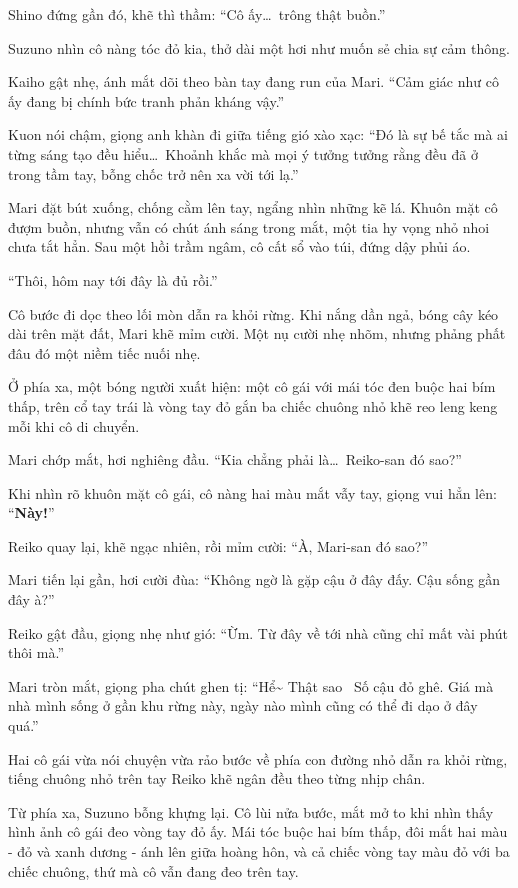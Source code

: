 \documentclass[../main.tex]{subfiles}
\begin{document}
Shino đứng gần đó, khẽ thì thầm: ``Cô ấy\dots\ trông thật buồn.''

Suzuno nhìn cô nàng tóc đỏ kia, thở dài một hơi như muốn sẻ chia sự cảm thông.

Kaiho gật nhẹ, ánh mắt dõi theo bàn tay đang run của Mari. ``Cảm giác như cô ấy đang bị chính bức tranh phản kháng vậy.''

Kuon nói chậm, giọng anh khàn đi giữa tiếng gió xào xạc: ``Đó là sự bế tắc mà ai từng sáng tạo đều hiểu\dots\ Khoảnh khắc mà mọi ý tưởng tưởng rằng đều đã ở trong tầm tay, bỗng chốc trở nên xa vời tới lạ.''

Mari đặt bút xuống, chống cằm lên tay, ngẩng nhìn những kẽ lá. Khuôn mặt cô đượm buồn, nhưng vẫn có chút ánh sáng trong mắt, một tia hy vọng nhỏ nhoi chưa tắt hẳn. Sau một hồi trầm ngâm, cô cất sổ vào túi, đứng dậy phủi áo.

``Thôi, hôm nay tới đây là đủ rồi.''

Cô bước đi dọc theo lối mòn dẫn ra khỏi rừng. Khi nắng dần ngả, bóng cây kéo dài trên mặt đất, Mari khẽ mỉm cười. Một nụ cười nhẹ nhõm, nhưng phảng phất đâu đó một niềm tiếc nuối nhẹ.

Ở phía xa, một bóng người xuất hiện: một cô gái với mái tóc đen buộc hai bím thấp, trên cổ tay trái là vòng tay đỏ gắn ba chiếc chuông nhỏ khẽ reo leng keng mỗi khi cô di chuyển.

Mari chớp mắt, hơi nghiêng đầu. ``Kia chẳng phải là\dots\ Reiko-san đó sao?''

Khi nhìn rõ khuôn mặt cô gái, cô nàng hai màu mắt vẫy tay, giọng vui hẳn lên: ``\textbf{Này!}''

Reiko quay lại, khẽ ngạc nhiên, rồi mỉm cười: ``À, Mari-san đó sao?''

Mari tiến lại gần, hơi cười đùa: ``Không ngờ là gặp cậu ở đây đấy. Cậu sống gần đây à?''

Reiko gật đầu, giọng nhẹ như gió: ``Ừm. Từ đây về tới nhà cũng chỉ mất vài phút thôi mà.''

Mari tròn mắt, giọng pha chút ghen tị: ``Hể\~{} Thật sao~{} Số cậu đỏ ghê. Giá mà nhà mình sống ở gần khu rừng này, ngày nào mình cũng có thể đi dạo ở đây quá.''

Hai cô gái vừa nói chuyện vừa rảo bước về phía con đường nhỏ dẫn ra khỏi rừng, tiếng chuông nhỏ trên tay Reiko khẽ ngân đều theo từng nhịp chân.

Từ phía xa, Suzuno bỗng khựng lại. Cô lùi nửa bước, mắt mở to khi nhìn thấy hình ảnh cô gái đeo vòng tay đỏ ấy. Mái tóc buộc hai bím thấp, đôi mắt hai màu - đỏ và xanh dương - ánh lên giữa hoàng hôn, và cả chiếc vòng tay màu đỏ với ba chiếc chuông, thứ mà cô vẫn đang đeo trên tay.
\end{document}
